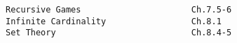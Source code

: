 \documentclass[handout]{mcs}
\begin{document}
\renewcommand{\reading}{
\begin{itemize}

\item Chapter~\bref{recursive_data_chap}. \emph{Recursive Data}
\item Chapter~\bref{infinite_chap}. \emph{Infinite Cardinality, Diagonal Arguments, Set Theory}


 \end{itemize}}


\begin{staffnotes}
\begin{verbatim}
Recursive Games                      Ch.7.5-6
Infinite Cardinality                 Ch.8.1
Set Theory                           Ch.8.4-5              
\end{verbatim}
\end{staffnotes}









\end{document}
